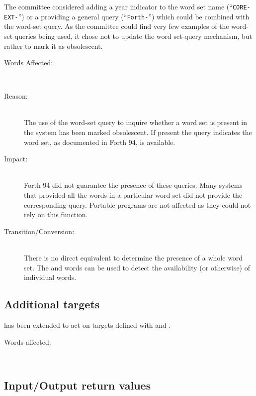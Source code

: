 The committee considered adding a year indicator to the word set name
(``\texttt{CORE-EXT-\snapshot}'') or a providing a general query
(``\texttt{Forth-\snapshot}'') which could be combined with the
word-set query.  As the committee could find very few examples of the
word-set queries being used, it chose not to update the word set-query
mechanism, but rather to mark it as obsolescent.

\pagebreak
\begin{description}
\item[Words Affected:] ~\\

\item[Reason:] ~\\
	The use of the word-set query to inquire whether a word set is
	present in the system has been marked obsolescent.  If present
	the query indicates the word set, as documented in Forth 94, is
	available.

\item[Impact:] ~\\
	Forth 94 did not guarantee the presence of these queries.  Many
	systems that provided all the words in a particular word set did
	not provide the corresponding query.  Portable programs are not
	affected as they could not rely on this function.

\item[Transition/Conversion:] ~\\
	There is no direct equivalent to determine the presence of a whole
	word set.  The  and 
	words can be used to detect the availability (or otherwise) of
	individual words.
\end{description}


\subsection[Additional TO targets]{Additional  targets} %
\label{diff:12:to}

 has been extended to act on targets defined with
 and .

\begin{description}
\item[Words affected:] ~\\
\end{description}


\subsection{Input/Output return values} %
\label{diff:12:ior}


